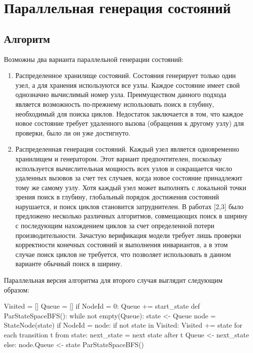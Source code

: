 \documentclass[utf8]{G7-32}
\begin{document}
\chapter{Параллельная генерация состояний}
\label{sec:par-statespace}

\section{Алгоритм}
\label{sec:par-algo}

Возможны два варианта параллельной генерации состояний:

\begin{enumerate}
\item Распределенное хранилище состояний. Состояния генерирует только
  один узел, а для хранения используются все узлы. Каждое состояние
  имеет свой однозначно вычислимый номер узла. Преимуществом данного
  подхода является возможность по-прежнему использовать поиск в
  глубину, необходимый для поиска циклов. Недостаток заключается в
  том, что каждое новое состояние требует удаленного вызова (обращения
  к другому узлу) для проверки, было ли он уже достигнуто.

\item Распределенная генерация состояний. Каждый узел является
  одновременно хранилищем и генератором. Этот вариант предпочтителен,
  поскольку используется вычислительная мощность всех узлов и
  сокращается число удаленных вызовов за счет тех случаев, когда новое
  состояние принадлежит тому же самому узлу. Хотя каждый узел может
  выполнять с локальной точки зрения поиск в глубину, глобальный
  порядок достижения состояний нарушается, и поиск циклов становится
  затруднителен. В работах [2,3] было предложено несколько различных
  алгоритмов, совмещающих поиск в ширину с последующим нахождением
  циклов за счет определенной потери производительности. Зачастую
  верификация модели требует лишь проверки корректности конечных
  состояний и выполнения инвариантов, а в этом случае поиск циклов не
  требуется, что позволяет использовать в данном варианте обычный
  поиск в ширину.
\end{enumerate}

Параллельная версия алгоритма для второго случая выглядит следующим
образом:

\begin{CodeBlock}
Visited = []
Queue = []
if NodeId = 0:
    Queue += start_state
def ParStateSpaceBFS():
    while not empty(Queue):
        state <- Queue
        node = StateNode(state)
        if NodeId = node:
            if not state in Visited:
                Visited += state
                for each transition t from state:
                    next_state = next state after t
                    Queue <- next_state
        else:
            node.Queue <- state
ParStateSpaceBFS()
\end{CodeBlock}
\end{document}
